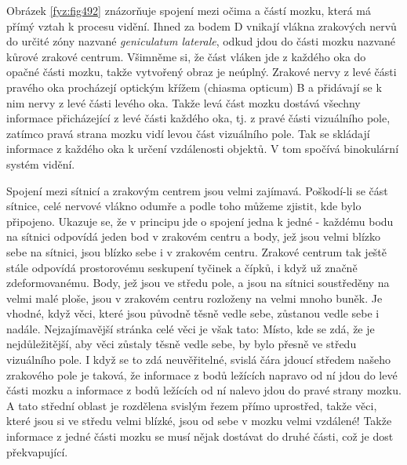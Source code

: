     Obrázek \ref{fyz:fig492} znázorňuje spojení mezi očima a částí mozku, která má přímý vztah k
    procesu vidění. Ihned za bodem D vnikají vlákna zrakových nervů do určité zóny nazvané
    \emph{geniculatum laterale}, odkud jdou do části mozku nazvané kůrové zrakové centrum. Všimněme
    si, že část vláken jde z každého oka do opačné části mozku, takže vytvořený obraz je neúplný.
    Zrakové nervy z levé části pravého oka procházejí optickým křížem (chiasma opticum) B a
    přidávají se k nim nervy z levé části levého oka. Takže levá část mozku dostává všechny
    informace přicházející z levé části každého oka, tj. z pravé části vizuálního pole, zatímco
    pravá strana mozku vidí levou část vizuálního pole. Tak se skládají informace z každého oka k
    určení vzdálenosti objektů. V tom spočívá binokulární systém vidění.

    Spojení mezi sítnicí a zrakovým centrem jsou velmi zajímavá. Poškodí-li se část sítnice, celé
    nervové vlákno odumře a podle toho můžeme zjistit, kde bylo připojeno. Ukazuje se, že v principu
    jde o spojení jedna k jedné - každému bodu na sítnici odpovídá jeden bod v zrakovém centru a
    body, jež jsou velmi blízko sebe na sítnici, jsou blízko sebe i v zrakovém centru. Zrakové
    centrum tak ještě stále odpovídá prostorovému seskupení tyčinek a čípků, i když už značně
    zdeformovanému. Body, jež jsou ve středu pole, a jsou na sítnici soustředěny na velmi malé
    ploše, jsou v zrakovém centru rozloženy na velmi mnoho buněk. Je vhodné, když věci, které jsou
    původně těsně vedle sebe, zůstanou vedle sebe i nadále. Nejzajímavější stránka celé věci je však
    tato: Místo, kde se zdá, že je nejdůležitější, aby věci zůstaly těsně vedle sebe, by bylo přesně
    ve středu vizuálního pole. I když se to zdá neuvěřitelné, svislá čára jdoucí středem našeho
    zrakového pole je taková, že informace z bodů ležících napravo od ní jdou do levé části mozku a
    informace z bodů ležících od ní nalevo jdou do pravé strany mozku. A tato střední oblast je
    rozdělena svislým řezem přímo uprostřed, takže věci, které jsou si ve středu velmi blízké, jsou
    od sebe v mozku velmi vzdálené! Takže informace z jedné části mozku se musí nějak dostávat do
    druhé části, což je dost překvapující.


